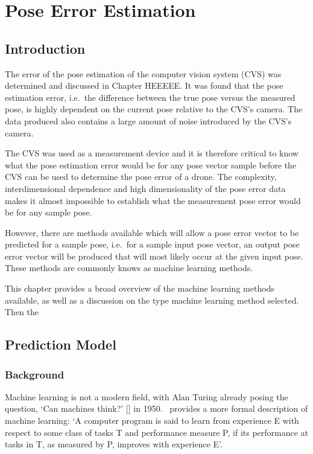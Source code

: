 \chapter{Pose Error Estimation}

\section{Introduction}

The error of the pose estimation of the computer vision system (CVS) was determined and discussed in Chapter HEEEEE\@. It was found that the pose estimation error, i.e.\ the difference between the true pose versus the measured pose, is highly dependent on the current pose relative to the CVS's camera. The data produced also contains a large amount of noise introduced by the CVS's camera. 

The CVS was used as a measurement device and it is therefore critical to know what the pose estimation error would be for any pose vector sample before the CVS can be used to determine the pose error of a drone. The complexity, interdimensional dependence and high dimensionality of the pose error data makes it almost impossible to establish what the measurement pose error would be for any sample pose.

However, there are methods available which will allow a pose error vector to be predicted for a sample pose, i.e.\ for a sample input pose vector, an output pose error vector will be produced that will most likely occur at the given input pose. These methods are commonly knows as machine learning methods.

This chapter provides a broad overview of the machine learning methods available, as well as a discussion on the type machine learning method selected. Then the

\section{Prediction Model}

\subsection{Background}

Machine learning is not a modern field, with Alan Turing already posing the question, `Can machines think?' [\cite{turing1950computing}] in 1950.~\cite{michalski2013machine} provides a more formal description of machine learning: `A computer program is said to learn from experience E with respect to some class of tasks T and performance measure P, if its performance at tasks in T, as measured by P, improves with experience E'. 



